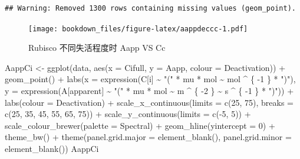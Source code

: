 \documentclass[
]{krantz}
\makeatletter
\newenvironment{Shaded}{\begin{snugshade}}{\end{snugshade}}
\newcommand{\AttributeTok}[1]{\textcolor[rgb]{0.77,0.63,0.00}{#1}}
\newcommand{\DecValTok}[1]{\textcolor[rgb]{0.00,0.00,0.81}{#1}}
\newcommand{\FunctionTok}[1]{\textcolor[rgb]{0.00,0.00,0.00}{#1}}
\newcommand{\NormalTok}[1]{#1}
\newcommand{\OtherTok}[1]{\textcolor[rgb]{0.56,0.35,0.01}{#1}}
\newcommand{\SpecialCharTok}[1]{\textcolor[rgb]{0.00,0.00,0.00}{#1}}
\newcommand{\StringTok}[1]{\textcolor[rgb]{0.31,0.60,0.02}{#1}}
\newenvironment{kframe}{%
\medskip{}
\setlength{\fboxsep}{.8em}
 \def\at@end@of@kframe{}%
 \ifinner\ifhmode%
  \def\at@end@of@kframe{\end{minipage}}%
  \begin{minipage}{\columnwidth}%
 \fi\fi%
 \def\FrameCommand##1{\hskip\@totalleftmargin \hskip-\fboxsep
 \colorbox{shadecolor}{##1}\hskip-\fboxsep
     \hskip-\linewidth \hskip-\@totalleftmargin \hskip\columnwidth}%
 \MakeFramed {\advance\hsize-\width
   \@totalleftmargin\z@ \linewidth\hsize
   \@setminipage}}%
 {\par\unskip\endMakeFramed%
 \at@end@of@kframe}
\renewenvironment{Shaded}{\begin{kframe}}{\end{kframe}}
\makeatother
\begin{document}
\begin{verbatim}
## Warning: Removed 1300 rows containing missing values (geom_point).
\end{verbatim}

\begin{figure}
\centering
\texttt{[image: bookdown\_files/figure-latex/aappdeccc-1.pdf]}
\caption{\label{fig:aappdeccc}Rubisco 不同失活程度时 Aapp VS Cc}
\end{figure}

\begin{Shaded}
\begin{Highlighting}[]
\NormalTok{AappCi }\OtherTok{\textless{}{-}}
  \FunctionTok{ggplot}\NormalTok{(data, }\FunctionTok{aes}\NormalTok{(}\AttributeTok{x =}\NormalTok{ Cifull, }\AttributeTok{y =}\NormalTok{ Aapp, }\AttributeTok{colour =}\NormalTok{ Deactivation)) }\SpecialCharTok{+}
  \FunctionTok{geom\_point}\NormalTok{() }\SpecialCharTok{+}
  \FunctionTok{labs}\NormalTok{(}\AttributeTok{x =} \FunctionTok{expression}\NormalTok{(C[i] }\SpecialCharTok{\textasciitilde{}} \StringTok{"("} \SpecialCharTok{*}\NormalTok{ mu }\SpecialCharTok{*}\NormalTok{ mol }\SpecialCharTok{\textasciitilde{}}\NormalTok{ mol }\SpecialCharTok{\^{}}\NormalTok{ \{}
    \SpecialCharTok{{-}}\DecValTok{1}
\NormalTok{  \} }\SpecialCharTok{*} \StringTok{")"}\NormalTok{),}
  \AttributeTok{y =} \FunctionTok{expression}\NormalTok{(A[apparent] }\SpecialCharTok{\textasciitilde{}} \StringTok{"("} \SpecialCharTok{*}\NormalTok{ mu }\SpecialCharTok{*}\NormalTok{ mol }\SpecialCharTok{\textasciitilde{}}\NormalTok{ m }\SpecialCharTok{\^{}}\NormalTok{ \{}
    \SpecialCharTok{{-}}\DecValTok{2}
\NormalTok{  \} }\SpecialCharTok{\textasciitilde{}}\NormalTok{ s }\SpecialCharTok{\^{}}\NormalTok{ \{}
    \SpecialCharTok{{-}}\DecValTok{1}
\NormalTok{  \} }\SpecialCharTok{*} \StringTok{")"}\NormalTok{)) }\SpecialCharTok{+}
  \FunctionTok{labs}\NormalTok{(}\AttributeTok{colour =} \StringTok{\textquotesingle{}Deactivation\textquotesingle{}}\NormalTok{) }\SpecialCharTok{+}
  \FunctionTok{scale\_x\_continuous}\NormalTok{(}\AttributeTok{limits =} \FunctionTok{c}\NormalTok{(}\DecValTok{25}\NormalTok{, }\DecValTok{75}\NormalTok{),}
                     \AttributeTok{breaks =} \FunctionTok{c}\NormalTok{(}\DecValTok{25}\NormalTok{, }\DecValTok{35}\NormalTok{, }\DecValTok{45}\NormalTok{, }\DecValTok{55}\NormalTok{, }\DecValTok{65}\NormalTok{, }\DecValTok{75}\NormalTok{)) }\SpecialCharTok{+}
  \FunctionTok{scale\_y\_continuous}\NormalTok{(}\AttributeTok{limits =} \FunctionTok{c}\NormalTok{(}\SpecialCharTok{{-}}\DecValTok{5}\NormalTok{, }\DecValTok{5}\NormalTok{)) }\SpecialCharTok{+}
  \FunctionTok{scale\_colour\_brewer}\NormalTok{(}\AttributeTok{palette =} \StringTok{\textquotesingle{}Spectral\textquotesingle{}}\NormalTok{) }\SpecialCharTok{+}
  \FunctionTok{geom\_hline}\NormalTok{(}\AttributeTok{yintercept =} \DecValTok{0}\NormalTok{) }\SpecialCharTok{+}
  \FunctionTok{theme\_bw}\NormalTok{() }\SpecialCharTok{+}
  \FunctionTok{theme}\NormalTok{(}\AttributeTok{panel.grid.major =} \FunctionTok{element\_blank}\NormalTok{(),}
        \AttributeTok{panel.grid.minor =} \FunctionTok{element\_blank}\NormalTok{())}
\NormalTok{AappCi}
\end{Highlighting}
\end{Shaded}
\end{document}
